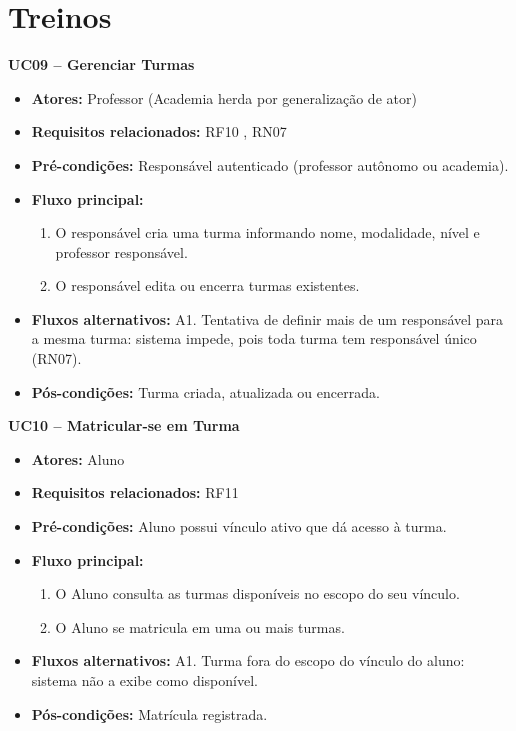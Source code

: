 \section*{Treinos}

\noindent\textbf{UC09 -- Gerenciar Turmas}
\begin{itemize}[leftmargin=*, itemsep=0pt, topsep=2pt]
  \item \textbf{Atores:} Professor (Academia herda por generalização de ator)
  \item \textbf{Requisitos relacionados:} RF10 , RN07
  \item \textbf{Pré-condições:} Responsável autenticado (professor autônomo ou academia).
  \item \textbf{Fluxo principal:}
  \begin{enumerate}[label=\arabic*., itemsep=0pt, topsep=0pt]
    \item O responsável cria uma turma informando nome, modalidade, nível e professor responsável.
    \item O responsável edita ou encerra turmas existentes.
  \end{enumerate}
  \item \textbf{Fluxos alternativos:} A1. Tentativa de definir mais de um responsável para a mesma turma: sistema impede, pois toda turma tem responsável único (RN07).
  \item \textbf{Pós-condições:} Turma criada, atualizada ou encerrada.
\end{itemize}
\medskip

\noindent\textbf{UC10 -- Matricular-se em Turma}
\begin{itemize}[leftmargin=*, itemsep=0pt, topsep=2pt]
  \item \textbf{Atores:} Aluno
  \item \textbf{Requisitos relacionados:} RF11
  \item \textbf{Pré-condições:} Aluno possui vínculo ativo que dá acesso à turma.
  \item \textbf{Fluxo principal:}
  \begin{enumerate}[label=\arabic*., itemsep=0pt, topsep=0pt]
    \item O Aluno consulta as turmas disponíveis no escopo do seu vínculo.
    \item O Aluno se matricula em uma ou mais turmas.
  \end{enumerate}
  \item \textbf{Fluxos alternativos:} A1. Turma fora do escopo do vínculo do aluno: sistema não a exibe como disponível.
  \item \textbf{Pós-condições:} Matrícula registrada.
\end{itemize}
\medskip

